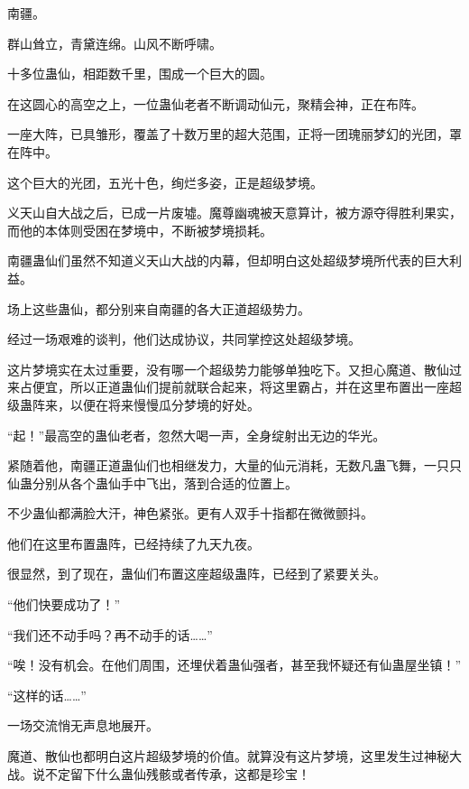 
\begin{this_body}



南疆。

群山耸立，青黛连绵。山风不断呼啸。

十多位蛊仙，相距数千里，围成一个巨大的圆。

在这圆心的高空之上，一位蛊仙老者不断调动仙元，聚精会神，正在布阵。

一座大阵，已具雏形，覆盖了十数万里的超大范围，正将一团瑰丽梦幻的光团，罩在阵中。

这个巨大的光团，五光十色，绚烂多姿，正是超级梦境。

义天山自大战之后，已成一片废墟。魔尊幽魂被天意算计，被方源夺得胜利果实，而他的本体则受困在梦境中，不断被梦境损耗。

南疆蛊仙们虽然不知道义天山大战的内幕，但却明白这处超级梦境所代表的巨大利益。

场上这些蛊仙，都分别来自南疆的各大正道超级势力。

经过一场艰难的谈判，他们达成协议，共同掌控这处超级梦境。

这片梦境实在太过重要，没有哪一个超级势力能够单独吃下。又担心魔道、散仙过来占便宜，所以正道蛊仙们提前就联合起来，将这里霸占，并在这里布置出一座超级蛊阵来，以便在将来慢慢瓜分梦境的好处。

“起！”最高空的蛊仙老者，忽然大喝一声，全身绽射出无边的华光。

紧随着他，南疆正道蛊仙们也相继发力，大量的仙元消耗，无数凡蛊飞舞，一只只仙蛊分别从各个蛊仙手中飞出，落到合适的位置上。

不少蛊仙都满脸大汗，神色紧张。更有人双手十指都在微微颤抖。

他们在这里布置蛊阵，已经持续了九天九夜。

很显然，到了现在，蛊仙们布置这座超级蛊阵，已经到了紧要关头。

“他们快要成功了！”

“我们还不动手吗？再不动手的话……”

“唉！没有机会。在他们周围，还埋伏着蛊仙强者，甚至我怀疑还有仙蛊屋坐镇！”

“这样的话……”

一场交流悄无声息地展开。

魔道、散仙也都明白这片超级梦境的价值。就算没有这片梦境，这里发生过神秘大战。说不定留下什么蛊仙残骸或者传承，这都是珍宝！


\end{this_body}
